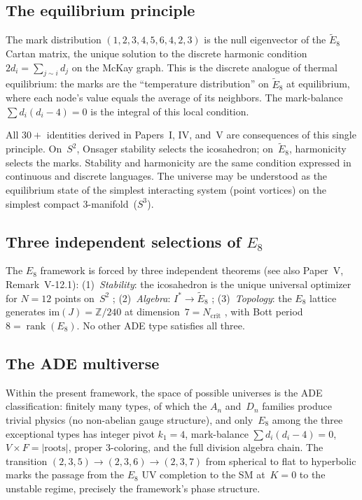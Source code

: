 \subsection{The equilibrium principle}
\label{sec:equilibrium-principle}

The mark distribution $(1,2,3,4,5,6,4,2,3)$ is the null eigenvector
of the $\tilde{E}_8$ Cartan matrix, the unique solution to the discrete
harmonic condition $2d_i = \sum_{j \sim i} d_j$ on the McKay graph.
This is the discrete analogue of thermal equilibrium:
the marks are the ``temperature distribution'' on $\tilde{E}_8$ at
equilibrium, where each node's value equals the average of its
neighbors.  The mark-balance $\sum d_i(d_i - 4) = 0$ is the
integral of this local condition.

All $30{+}$ identities derived in Papers~I, IV, and~V are
consequences of this single principle.  On~$S^2$, Onsager stability
selects the icosahedron; on~$\tilde{E}_8$, harmonicity selects
the marks.  Stability and harmonicity are the same condition
expressed in continuous and discrete languages.
The universe may be understood as the equilibrium state of
the simplest interacting system (point vortices) on the
simplest compact $3$-manifold~($S^3$).

\subsection{Three independent selections of $E_8$}

The $E_8$ framework is forced by three independent theorems
(see also Paper~V, Remark~V-12.1):
(1)~\emph{Stability}: the icosahedron is the unique universal optimizer
for $N = 12$ points on~$S^2$ \citep{CohnKumar2007};
(2)~\emph{Algebra}: $I^* \to \tilde{E}_8$ \citep{McKay1980};
(3)~\emph{Topology}: the $E_8$ lattice generates
$\mathrm{im}(J) = \mathbb{Z}/240$ at dimension~$7 = N_{\mathrm{crit}}$
\citep{Adams1974}, with Bott period~$8 = \operatorname{rank}(E_8)$.
No other ADE type satisfies all three.

\subsection{The ADE multiverse}

Within the present framework, the space of possible universes
is the ADE classification: finitely many types, of which
the $A_n$ and~$D_n$ families produce trivial physics (no non-abelian
gauge structure), and only~$E_8$ among the three exceptional types
has integer pivot $k_1 = 4$, mark-balance $\sum d_i(d_i-4)=0$,
$V \times F = |\text{roots}|$, proper $3$-coloring, and the
full division algebra chain.
The transition $(2,3,5) \to (2,3,6) \to (2,3,7)$
from spherical to flat to hyperbolic marks the passage from
the $E_8$ UV completion to the SM at~$K = 0$ to the unstable
regime, precisely the framework's phase structure.

